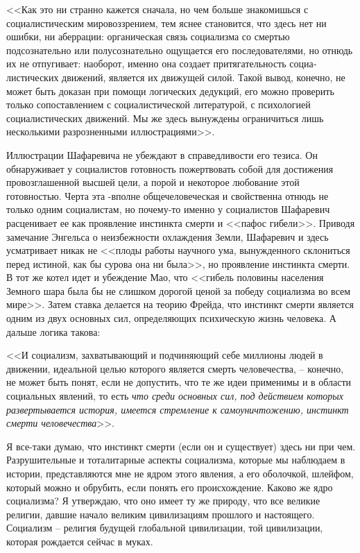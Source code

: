 \documentclass{book}
\begin{document}
<<Как это ни странно кажется сначала, но чем больше знако­мишься с социалистическим мировоззрением, тем яснее стано­вится, что здесь нет ни ошибки, ни аберрации: органическая связь социализма со смертью подсознательно или полусозна­тельно ощущается его последователями, но отнюдь их не отпу­гивает: наоборот, именно она создает притягательность социа­листических движений, является их движущей силой. Такой вывод, конечно, не может быть доказан при помощи логиче­ских дедукций, его можно проверить только сопоставлением с социалистической литературой, с психологией социалисти­ческих движений. Мы же здесь вынуждены ограничиться лишь несколькими разрозненными иллюстрациями>>.%

Иллюстрации Шафаревича не убеждают в справедливости его тезиса. Он обнаруживает у социалистов готовность пожертво­вать собой для достижения провозглашенной высшей цели, а порой и некоторое любование этой готовностью. Черта эта -вполне общечеловеческая и свойственна отнюдь не только од­ним социалистам, но почему-то именно у социалистов Шафаревич расценивает ее как проявление инстинкта смерти и <<пафос гибели>>. Приводя замечание Энгельса о неизбежности охлажде­ния Земли, Шафаревич и здесь усматривает никак не <<плоды работы научного ума, вынужденного склониться перед истиной, как бы сурова она ни была>>, но проявление инстинкта смерти. В тот же котел идет и убеждение Мао, что <<гибель половины на­селения Земного шара была бы не слишком дорогой ценой за победу социализма во всем мире>>. Затем ставка делается на тео­рию Фрейда, что инстинкт смерти является одним из двух основ­ных сил, определяющих психическую жизнь человека. А даль­ше логика такова:

<<И социализм, захватывающий и подчиняющий себе миллио­ны людей в движении, идеальной целью которого является смерть человечества, -- конечно, не может быть понят, если не допустить, что те же идеи применимы и в области социальных явлений, то есть \textit{что среди основных сил, под действием кото­рых развертывается история, имеется стремление к самоунич­тожению, инстинкт смерти человечества}>>. 

Я все-таки думаю, что инстинкт смерти (если он и сущест­вует) здесь ни при чем. Разрушительные и тоталитарные аспек­ты социализма, которые мы наблюдаем в истории, представля­ются мне не ядром этого явления, а его оболочкой, шлейфом, который можно и обрубить, если понять его происхождение. Каково же ядро социализма? Я утверждаю, что оно имеет ту же природу, что все великие религии, давшие начало великим цивилизациям прошлого и настоящего. Социализм -- религия будущей глобальной цивилизации, той цивилизации, которая рождается сейчас в муках.
\end{document}
